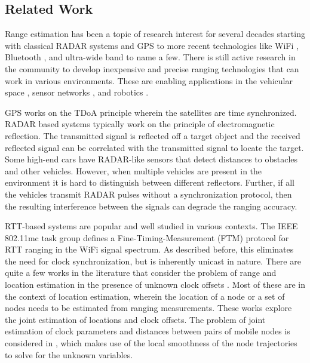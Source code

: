 \documentclass[12pt,journal,final,onecolumn]{IEEEtran}
\theoremstyle{definition}
\theoremstyle{myremark}
\begin{document}
\subsection{Related Work}
\label{sec:intro_related}

Range estimation has been a topic of research interest for several decades
starting with classical RADAR systems \cite{levanon1988radar} and GPS
\cite{misra2006global} to more recent technologies like WiFi \cite{11mc},
Bluetooth \cite{hossain2007comprehensive}, and ultra-wide band
\cite{lee2002ranging} to name a few. There is still active research in the
community to develop inexpensive and precise ranging technologies that can work
in various environments. These are enabling applications in the vehicular space
\cite{parker2006vehicle,alam2009range,alam2010dynamic,boukerche2008vehicular}, sensor networks \cite{hu2004localization,lanzisera2006rf,denis2006joint}, and robotics
\cite{cao1997cooperative,djugash2006range}. 

GPS works on the TDoA principle wherein the satellites are time synchronized.
RADAR based systems typically work on the principle of electromagnetic
reflection. The transmitted signal is reflected off a target object and the
received reflected signal can be correlated with the transmitted signal to
locate the target. Some high-end cars have RADAR-like sensors that detect
distances to obstacles and other vehicles.  However, when multiple vehicles are
present in the environment it is hard to distinguish between different
reflectors. Further, if all the vehicles transmit RADAR pulses without a
synchronization protocol, then the resulting interference between the signals
can degrade the ranging accuracy.

RTT-based systems are popular and well studied in various contexts. The IEEE
802.11mc task group defines a Fine-Timing-Measurement (FTM) protocol \cite{11mc}
for RTT ranging in the WiFi signal spectrum. As described before, this
eliminates the need for clock synchronization, but is inherently unicast in
nature. There are quite a few works in the literature that consider the problem
of range and location estimation in the presence of unknown clock offsets
\cite{wang2011robust, noh2007novel,zhou2011indoor}. Most of these are in the
context of location estimation, wherein the location of a node or a set of nodes
needs to be estimated from ranging measurements. These works explore the joint
estimation of locations and clock offsets. The problem of joint estimation of
clock parameters and distances between pairs of mobile nodes is considered in
\cite{rajan2012joint}, which makes use of the local smoothness of the node
trajectories to solve for the unknown variables. 
\end{document}
